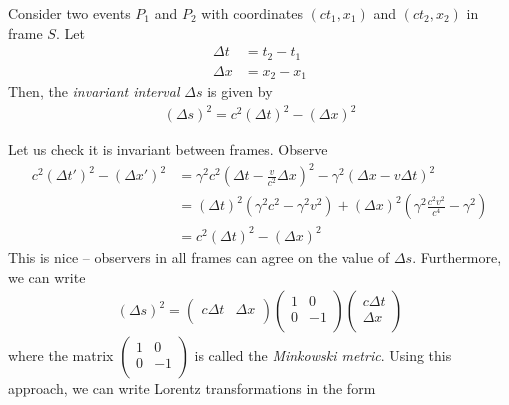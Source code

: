\documentclass{../../template/note}
\begin{document}
    
    \begin{definition}
        Consider two events \(P_1\) and \(P_2\) with coordinates \((ct_1, x_1)\) and \((ct_2, x_2)\) in frame \(S\). Let
        \begin{align*}
            \Delta t &= t_2 - t_1 \\
            \Delta x &= x_2 - x_1 
        \end{align*}
        Then, the \emph{invariant interval} \(\Delta s\) is given by
        \begin{align*}
            (\Delta s)^2 = c^2 (\Delta t)^2 - (\Delta x)^2
        \end{align*}
    \end{definition}
    Let us check it is invariant between frames. Observe
    \begin{align*}
        c^2(\Delta t')^2 - (\Delta x')^2 &= \gamma^2c^2\left(\Delta t - \frac{v}{c^2}\Delta x\right)^2 - \gamma^2(\Delta x - v\Delta t)^2 \\
        &= (\Delta t)^2(\gamma^2c^2-\gamma^2v^2) + (\Delta x)^2\left(\gamma^2 \frac{c^2v^2}{c^4}-\gamma^2\right) \\
        &= c^2(\Delta t)^2 - (\Delta x)^2
    \end{align*}
    This is nice -- observers in all frames can agree on the value of \(\Delta s\). Furthermore, we can write
    \begin{align*}
        (\Delta s)^2 = \begin{pmatrix}
         c\Delta t & \Delta x \\
        \end{pmatrix} \begin{pmatrix}
         1 & 0 \\
         0 & -1 \\
        \end{pmatrix}\begin{pmatrix}
         c\Delta t \\
         \Delta x \\
        \end{pmatrix}
    \end{align*}
    where the matrix \(\begin{pmatrix}
     1 & 0 \\
     0 & -1 \\
    \end{pmatrix}\) is called the \emph{Minkowski metric}. Using this approach, we can write Lorentz transformations in the form
\end{document}
